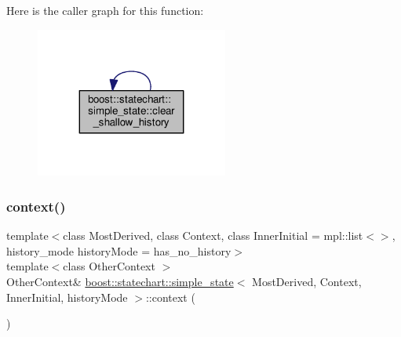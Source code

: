 Here is the caller graph for this function\+:
\nopagebreak
\begin{figure}[H]
\begin{center}
\leavevmode
\includegraphics[width=179pt]{classboost_1_1statechart_1_1simple__state_a6a338130243f1ad8fa655e4dd3e57ca2_icgraph}
\end{center}
\end{figure}
\mbox{\label{classboost_1_1statechart_1_1simple__state_ad03964fab8bcfc34742edcf0f5570d92}} 
\subsubsection{\texorpdfstring{context()}{context()}\hspace{0.1cm}{\footnotesize\ttfamily [1/2]}}
{\footnotesize\ttfamily template$<$class Most\+Derived, class Context, class Inner\+Initial = mpl\+::list$<$$>$, history\+\_\+mode history\+Mode = has\+\_\+no\+\_\+history$>$ \\
template$<$class Other\+Context $>$ \\
Other\+Context\& \mbox{\hyperlink{classboost_1_1statechart_1_1simple__state}{boost\+::statechart\+::simple\+\_\+state}}$<$ Most\+Derived, Context, Inner\+Initial, history\+Mode $>$\+::context (\begin{DoxyParamCaption}{ }\end{DoxyParamCaption})\hspace{0.3cm}{\ttfamily [inline]}}

\mbox{\label{classboost_1_1statechart_1_1simple__state_ac055c1f205e10fe2d665b68b5038be2a}} 
